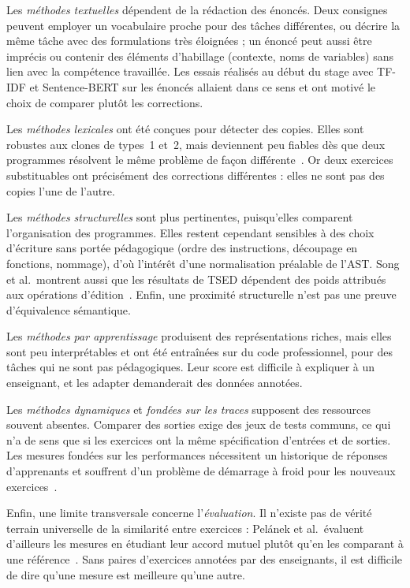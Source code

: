 Les \emph{méthodes textuelles} dépendent de la rédaction des énoncés. Deux consignes peuvent employer un vocabulaire proche pour des tâches différentes, ou décrire la même tâche avec des formulations très éloignées ; un énoncé peut aussi être imprécis ou contenir des éléments d'habillage (contexte, noms de variables) sans lien avec la compétence travaillée. Les essais réalisés au début du stage avec TF-IDF et Sentence-BERT sur les énoncés allaient dans ce sens et ont motivé le choix de comparer plutôt les corrections.

Les \emph{méthodes lexicales} ont été conçues pour détecter des copies. Elles sont robustes aux clones de types~1 et~2, mais deviennent peu fiables dès que deux programmes résolvent le même problème de façon différente~\cite{roy2009clones}. Or deux exercices substituables ont précisément des corrections différentes : elles ne sont pas des copies l'une de l'autre.

Les \emph{méthodes structurelles} sont plus pertinentes, puisqu'elles comparent l'organisation des programmes. Elles restent cependant sensibles à des choix d'écriture sans portée pédagogique (ordre des instructions, découpage en fonctions, nommage), d'où l'intérêt d'une normalisation préalable de l'AST. Song et al.\ montrent aussi que les résultats de TSED dépendent des poids attribués aux opérations d'édition~\cite{song2024tsed}. Enfin, une proximité structurelle n'est pas une preuve d'équivalence sémantique.

Les \emph{méthodes par apprentissage} produisent des représentations riches, mais elles sont peu interprétables et ont été entraînées sur du code professionnel, pour des tâches qui ne sont pas pédagogiques. Leur score est difficile à expliquer à un enseignant, et les adapter demanderait des données annotées.

Les \emph{méthodes dynamiques} et \emph{fondées sur les traces} supposent des ressources souvent absentes. Comparer des sorties exige des jeux de tests communs, ce qui n'a de sens que si les exercices ont la même spécification d'entrées et de sorties. Les mesures fondées sur les performances nécessitent un historique de réponses d'apprenants et souffrent d'un problème de démarrage à froid pour les nouveaux exercices~\cite{pelanek2020overview}.

Enfin, une limite transversale concerne l'\emph{évaluation}. Il n'existe pas de vérité terrain universelle de la similarité entre exercices : Pelánek et al.\ évaluent d'ailleurs les mesures en étudiant leur accord mutuel plutôt qu'en les comparant à une référence~\cite{pelanek2018programming}. Sans paires d'exercices annotées par des enseignants, il est difficile de dire qu'une mesure est \og meilleure \fg{} qu'une autre.

